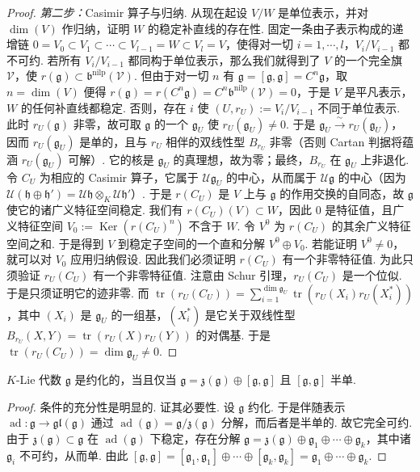 \begin{numpara}[借助表示的刻画]
\begin{proof}
\emph{第二步：}Casimir 算子与归纳. 从现在起设 $V/W$ 是单位表示，并对 $\dim(V)$ 作归纳，证明 $W$ 的稳定补直线的存在性. 固定一条由子表示构成的递增链 $0=V_0\subset V_1\subset\cdots\subset V_{l-1}=W\subset V_l=V$，使得对一切 $i=1,\cdots,l$，$V_i/V_{i-1}$ 都不可约.
若所有 $V_i/V_{i-1}$ 都同构于单位表示，那么我们就得到了 $V$ 的一个完全旗 $\mathcal V$，使 $r(\mathfrak g)\subset\mathfrak b^{\mathrm{nilp}}(\mathcal V)$. 但由于对一切 $n$ 有 $\mathfrak g=[\mathfrak g,\mathfrak g]=C^n\mathfrak g$，取 $n=\dim(V)$ 便得 $r(\mathfrak g)=r(C^n\mathfrak g)=C^n\mathfrak b^{\mathrm{nilp}}(\mathcal V)=0$，于是 $V$ 是平凡表示，$W$ 的任何补直线都稳定.
否则，存在 $i$ 使 $(U,r_U):=V_i/V_{i-1}$ 不同于单位表示. 此时 $r_U(\mathfrak g)$ 非零，故可取 $\mathfrak g$ 的一个 $\mathfrak g_U$ 使 $r_U(\mathfrak g_U)\neq 0$. 于是 $\mathfrak g_U\xrightarrow{\ \sim\ }r_U(\mathfrak g_U)$，因而 $r_U(\mathfrak g_U)$ 是单的，且与 $r_U$ 相伴的双线性型 $B_{r_U}$ 非零（否则 Cartan 判据将蕴涵 $r_U(\mathfrak g_U)$ 可解）. 它的核是 $\mathfrak g_U$ 的真理想，故为零；最终，$B_{r_U}$ 在 $\mathfrak g_U$ 上非退化. 令 $C_U$ 为相应的 Casimir 算子，它属于 $\mathcal{U}\mathfrak g_U$ 的中心，从而属于 $\mathcal{U}\mathfrak g$ 的中心（因为 $\mathcal{U}(\mathfrak h\oplus\mathfrak h')=\mathcal{U}\mathfrak h\otimes_K\mathcal{U}\mathfrak h'$）. 于是 $r(C_U)$ 是 $V$ 上与 $\mathfrak g$ 的作用交换的自同态，故 $\mathfrak g$ 使它的诸广义特征空间稳定. 我们有 $r(C_U)(V)\subset W$，因此 $0$ 是特征值，且广义特征空间 $V_0:=\operatorname{Ker}(r(C_U)^n)$ 不含于 $W$. 令 $V^0$ 为 $r(C_U)$ 的其余广义特征空间之和. 于是得到 $V$ 到稳定子空间的一个直和分解 $V^0\oplus V_0$. 若能证明 $V^0\neq 0$，就可以对 $V_0$ 应用归纳假设. 因此我们必须证明 $r(C_U)$ 有一个非零特征值. 为此只须验证 $r_U(C_U)$ 有一个非零特征值. 注意由 Schur 引理，$r_U(C_U)$ 是一个位似. 于是只须证明它的迹非零. 而 $\operatorname{tr}(r_U(C_U))=\sum_{i=1}^{\dim\mathfrak g_U}\operatorname{tr}(r_U(X_i)r_U(X_i^{*}))$，其中 $(X_i)$ 是 $\mathfrak g_U$ 的一组基，$(X_i^{*})$ 是它关于双线性型 $B_{r_U}(X,Y)=\operatorname{tr}(r_U(X)r_U(Y))$ 的对偶基. 于是 $\operatorname{tr}(r_U(C_U))=\dim\mathfrak g_U\neq 0$.
\end{proof}
\begin{corollary*}
$K$-Lie 代数 $\mathfrak g$ 是约化的，当且仅当 $\mathfrak g=\mathfrak z(\mathfrak g)\oplus[\mathfrak g,\mathfrak g]$ 且 $[\mathfrak g,\mathfrak g]$ 半单.
\end{corollary*}
\begin{proof}
条件的充分性是明显的. 证其必要性. 设 $\mathfrak g$ 约化. 于是伴随表示 $\operatorname{ad}\colon\mathfrak g\longrightarrow\mathfrak{gl}(\mathfrak g)$ 通过 $\operatorname{ad}(\mathfrak g)=\mathfrak g/\mathfrak z(\mathfrak g)$ 分解，而后者是半单的. 故它完全可约. 由于 $\mathfrak z(\mathfrak g)\subset\mathfrak g$ 在 $\operatorname{ad}(\mathfrak g)$ 下稳定，存在分解 $\mathfrak g=\mathfrak z(\mathfrak g)\oplus\mathfrak g_1\oplus\cdots\oplus\mathfrak g_k$，其中诸 $\mathfrak g_i$ 不可约，从而单. 由此 $[\mathfrak g,\mathfrak g]=[\mathfrak g_1,\mathfrak g_1]\oplus\cdots\oplus[\mathfrak g_k,\mathfrak g_k]=\mathfrak g_1\oplus\cdots\oplus\mathfrak g_k$.
\end{proof}
\end{numpara}

